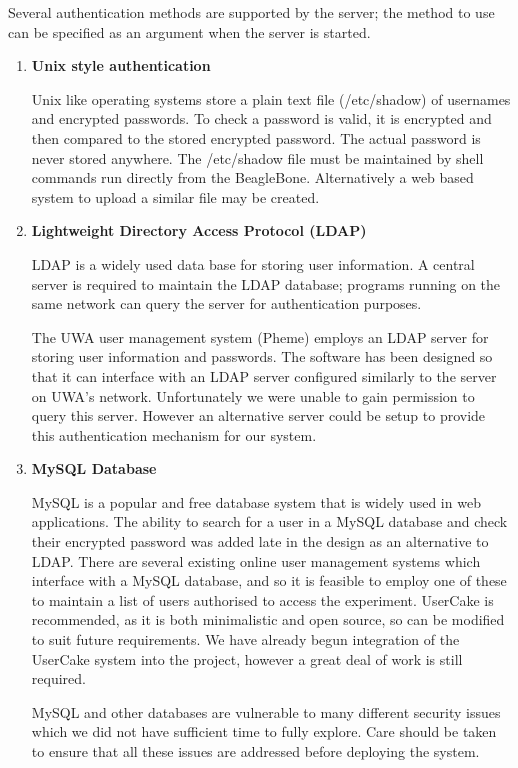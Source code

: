 Several authentication methods are supported by the server; the method to use can be specified as an argument when the server is started.
\begin{enumerate}
  \item {\bf Unix style authentication}


  Unix like operating systems store a plain text file (/etc/shadow) of usernames and encrypted passwords\cite{shadow}. To check a password is valid, it is encrypted and then compared to the stored encrypted password. The actual password is never stored anywhere. The /etc/shadow file must be maintained by shell commands run directly from the BeagleBone. Alternatively a web based system to upload a similar file may be created.

  \item {\bf Lightweight Directory Access Protocol (LDAP)}

  LDAP\cite{ldap, ldap_man} is a widely used data base for storing user information. A central server is required to maintain the LDAP database; programs running on the same network can query the server for authentication purposes.

  The UWA user management system (Pheme) employs an LDAP server for storing user information and passwords. The software has been designed so that it can interface with an LDAP server configured similarly to the server on UWA's network. Unfortunately we were unable to gain permission to query this server. However an alternative server could be setup to provide this authentication mechanism for our system.


  \item {\bf MySQL Database}

        MySQL\cite{mysql} is a popular and free database system that is widely used in web applications. The ability to search for a user in a MySQL database and check their encrypted password was added late in the design as an alternative to LDAP. There are several existing online user management systems which interface with a MySQL database, and so it is feasible to employ one of these to maintain a list of users authorised to access the experiment. UserCake\cite{UserCake} is recommended, as it is both minimalistic and open source, so can be modified to suit future requirements. We have already begun integration of the UserCake system into the project, however a great deal of work is still required.


  MySQL and other databases are vulnerable to many different security issues which we did not have sufficient time to fully explore. Care should be taken to ensure that all these issues are addressed before deploying the system.


\end{enumerate}

